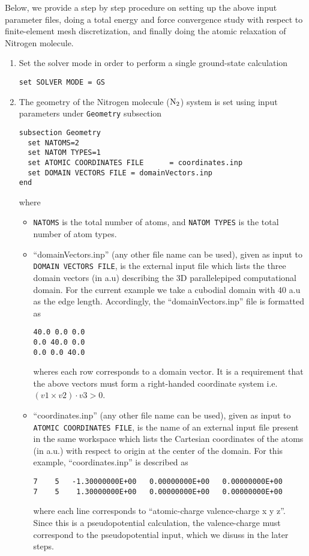 Below, we provide a step by step procedure on setting up the above input parameter files, doing a total energy and force convergence study with respect to finite-element mesh discretization, and finally doing the atomic relaxation of Nitrogen molecule.
\begin{enumerate}
\item Set the solver mode in order to perform a single ground-state calculation
\begin{verbatim}
set SOLVER MODE = GS
\end{verbatim}
\item The geometry of the Nitrogen molecule (${\rm N}_{2}$) system is set using input parameters under \verb|Geometry| subsection
\begin{verbatim}
subsection Geometry
  set NATOMS=2
  set NATOM TYPES=1
  set ATOMIC COORDINATES FILE      = coordinates.inp 
  set DOMAIN VECTORS FILE = domainVectors.inp
end
\end{verbatim}
where
\begin{itemize}		

\item \verb|NATOMS| is the total number of atoms, and \verb|NATOM TYPES| is the total number of atom types.
	
\item``domainVectors.inp'' (any other file name can be used), given as input to \verb|DOMAIN VECTORS FILE|,  is the external input file which lists the three domain vectors (in a.u) describing the
3D parallelepiped computational domain. For the current example we take a cubodial domain with 40 a.u as the edge length. 
Accordingly, the ``domainVectors.inp'' file is formatted as  
\begin{verbatim}
40.0 0.0 0.0
0.0 40.0 0.0
0.0 0.0 40.0
\end{verbatim}
wheres each row corresponds to a domain vector.
It is a requirement that the above vectors must form a right-handed coordinate system i.e. $(v1 \times v2)\cdot v3 >0$.

\item ``coordinates.inp'' (any other file name can be used), given as input to \verb|ATOMIC COORDINATES FILE|, is the name of an external input file present in the same workspace which lists the Cartesian coordinates of the atoms (in a.u.) with respect to origin at the center of the domain. For this example, ``coordinates.inp'' is described as 
\begin{verbatim}
7    5   -1.30000000E+00   0.00000000E+00   0.00000000E+00
7    5    1.30000000E+00   0.00000000E+00   0.00000000E+00
\end{verbatim}
where each line corresponds to ``atomic-charge valence-charge x y z''. Since this is a pseudopotential calculation, the valence-charge must correspond to the pseudopotential input, which we disuss in the later steps.


\end{itemize}
\end{enumerate}
